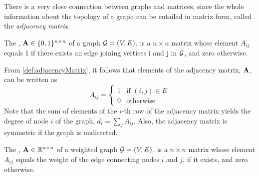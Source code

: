 There is a very close connection between graphs and matrices, since the whole information about the topology of a graph can be entailed in matrix form, called the \textit{adjacency matrix}.
\begin{definition}
	\label{def:adjacencyMatrix}
	The , $\mathbf A \in \{0,1\}^{n \times n}$ of a graph $\mathcal G = (V,E)$, is a $n\times n$ matrix whose element $A_{ij}$ equals 1 if there exists an edge joining vertices i and j in $\mathcal G$, and zero otherwise.
\end{definition}
From \cref{def:adjacencyMatrix}, it follows that elements of the adjacency matrix, $\mathbf A$, can be written as
\begin{equation*}
	A_{ij} =
	\begin{cases}
		1 & \text{if } (i,j) \in E\\
		0 & \text{otherwise}
	\end{cases}
\end{equation*}
Note that the sum of elements of the $i$-th row of the adjacency matrix yields the degree of node $i$ of the graph, $d_{i} = \sum_{j} A_{ij}$. Also, the adjacency matrix is symmetric if the graph is undirected.
\begin{definition}
	\label{def:weightedAdjacencyMatrix}
	The , $\mathbf A \in \mathbb{R}^{n \times n}$ of a weighted graph $\mathcal G = (V,E)$, is a $n\times n$ matrix whose element $A_{ij}$ equals the weight of the edge connecting nodes $i$ and $j$, if it exists, and zero otherwise. 
\end{definition}

